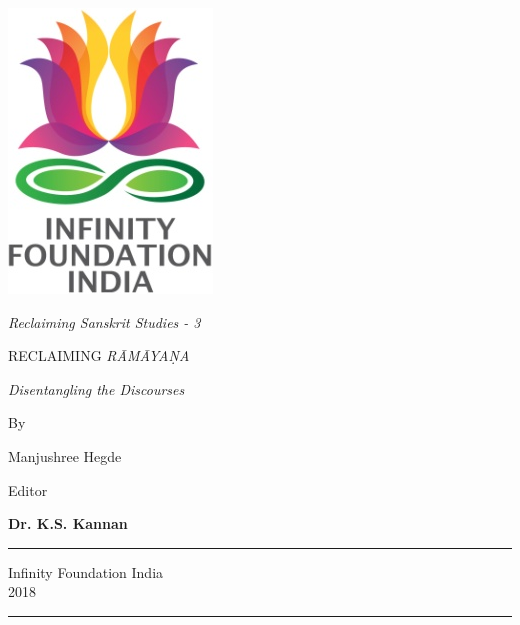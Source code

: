 \thispagestyle{empty}
\begin{center}
\includegraphics[scale=0.3]{figures/logo.png}
\bigskip

{\fontsize{10}{14}\selectfont\sl
Reclaiming Sanskrit Studies - 3}
\end{center}
\bigskip

\begin{center}
{\fontsize{20}{24}\selectfont RECLAIMING {\sl RĀMĀYAṆA}}\\[6pt]
\bigskip

{{\fontsize{17}{20}\selectfont\sl Disentangling the Discourses}}

\vfill

{\fontsize{12}{14}\selectfont 
By\par
}

{\fontsize{14}{18}\selectfont 
Manjushree Hegde\par
}

\bigskip
\bigskip

{\fontsize{12}{14}\selectfont 
Editor\par
}

{\fontsize{14}{18}\selectfont 
{\bf Dr. K.S. Kannan}\par
}
\vfill

\rule{5cm}{1pt}

{\fontsize{12}{14}\selectfont
Infinity Foundation India\\[4pt]
2018}

\rule{5cm}{1pt}
\end{center}




